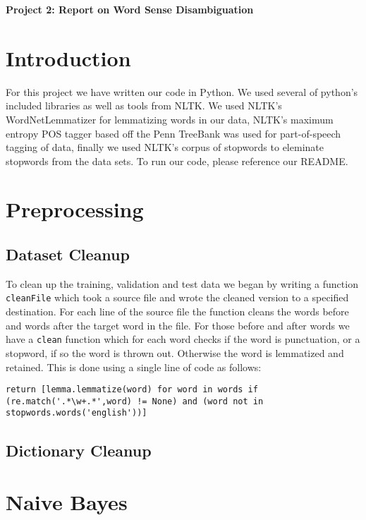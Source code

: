 \documentclass{article}
\begin{document}
\begin{center}\textbf{Project 2: Report on Word Sense Disambiguation}\end{center}

\section{Introduction}

For this project we have written our code in Python. We used several of python's included libraries as well as tools from NLTK. We used NLTK's WordNetLemmatizer for lemmatizing words in our data, NLTK's maximum entropy POS tagger based off the Penn TreeBank was used for part-of-speech tagging of data, finally we used NLTK's corpus of stopwords to eleminate stopwords from the data sets. To run our code, please reference our README.

\section{Preprocessing}

\subsection{Dataset Cleanup}

To clean up the training, validation and test data we began by writing a function \texttt{cleanFile} which took a source file and wrote the cleaned version to a specified destination. For each line of the source file the function cleans the words before and words after the target word in the file. For those before and after words we have a \texttt{clean} function which for each word checks if the word is punctuation, or a stopword, if so the word is thrown out. Otherwise the word is lemmatized and retained. This is done using a single line of code as follows:

{\small
\begin{verbatim}
return [lemma.lemmatize(word) for word in words if (re.match('.*\w+.*',word) != None) and (word not in stopwords.words('english'))]
\end{verbatim}
}

\subsection{Dictionary Cleanup}

\section{Naive Bayes}
\end{document}
